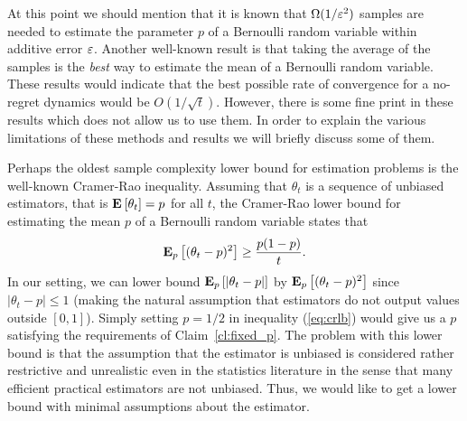 At this point we should mention that it is known
that $\Omega(1/\varepsilon^2)$ samples are needed to estimate the parameter $p$
of a Bernoulli random variable within additive error $\varepsilon$.
Another well-known result is that taking the average of the samples
is the \emph{best} way to estimate the mean of a Bernoulli random variable.
These results would indicate that the best possible rate of convergence
for a no-regret dynamics would be $O(1/\sqrt{t})$.
However, there is some fine print in these results which does not allow us
to use them. In order to explain the various limitations of
these methods and results we will briefly discuss some of them.

Perhaps the oldest sample complexity lower bound for estimation problems
is the well-known Cramer-Rao inequality.
Assuming that $\theta_t$ is a sequence of unbiased estimators,
that is $\Exp{\theta_t} = p$ for all $t$, the Cramer-Rao lower bound
for estimating the mean $p$ of a Bernoulli random variable states
that
\begin{equation}\label{eq:crlb}
  \bm{\mathrm{E}}_{p} \left[ (\theta_t - p)^2 \right] \geq \frac{p(1-p)}{t}.
\end{equation}
In our setting, we can lower bound $\bm{\mathrm{E}}_{p} \left[ |\theta_t - p| \right]$ by
$\bm{\mathrm{E}}_{p} \left[ (\theta_t - p)^2 \right]$ since $|\theta_t - p| \leq 1$
(making the natural assumption that estimators do not output values outside
$[0,1]$).
Simply setting $p=1/2$ in inequality (\ref{eq:crlb}) would give us a
$p$ satisfying the requirements of Claim~\ref{cl:fixed_p}.
The problem with this lower bound is that the assumption that the estimator
is unbiased is considered rather restrictive and unrealistic even in
the statistics literature in the sense that many efficient practical
estimators are not unbiased.  Thus, we would like to get a lower bound
with minimal assumptions about the estimator.


